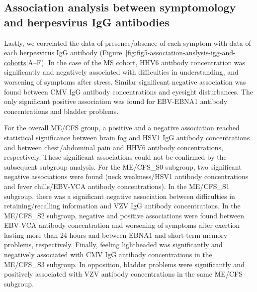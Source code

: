 \subsection{Association analysis between symptomology and herpesvirus IgG antibodies}

Lastly, we correlated the data of presence/absence of each symptom with data of each herpesvirus IgG antibody (Figure~\ref{fig:fig5-association-anslysis-igg-and-cohorts}A--F). In the case of the MS cohort, HHV6 antibody concentration was significantly and negatively associated with difficulties in understanding, and worsening of symptoms after stress. Similar significant negative association was found between CMV IgG antibody concentrations and eyesight disturbances. The only significant positive association was found for EBV-EBNA1 antibody concentrations and bladder problems.

For the overall ME/CFS group, a positive and a negative association reached statistical significance between brain fog and HSV1 IgG antibody concentrations and between chest/abdominal pain and HHV6 antibody concentrations, respectively. These significant associations could not be confirmed by the subsequent subgroup analysis. For the ME/CFS\_S0 subgroup, two significant negative associations were found (neck weakness/HSV1 antibody concentrations and fever chills/EBV-VCA antibody concentrations). In the ME/CFS\_S1 subgroup, there was a significant negative association between difficulties in retaining/recalling information and VZV IgG antibody concentrations. In the ME/CFS\_S2 subgroup, negative and positive associations were found between EBV-VCA antibody concentration and worsening of symptoms after exertion lasting more than 24 hours and between EBNA1 and short-term memory problems, respectively. Finally, feeling lightheaded was significantly and negatively associated with CMV IgG antibody concentrations in the ME/CFS\_S3 subgroup. In opposition, bladder problems were significantly and positively associated with VZV antibody concentrations in the same ME/CFS subgroup.

